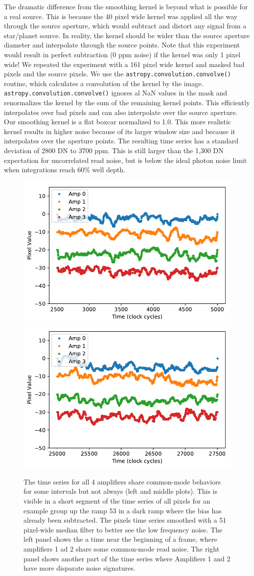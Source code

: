 \documentclass{aastex62}
\begin{document}
The dramatic difference from the smoothing kernel is beyond what is possible for a real source.
This is because the 40 pixel wide kernel was applied all the way through the source aperture, which would subtract and distort any signal from a star/planet source.
In reality, the kernel should be wider than the source aperture diameter and interpolate through the source points.
Note that this experiment would result in perfect subtraction (0 ppm noise) if the kernel was only 1 pixel wide!
We repeated the experiment with a 161 pixel wide kernel and masked bad pixels and the source pixels.
We use the \texttt{astropy.convolution.convolve()} routine, which calculates a convolution of the kernel by the image.
\texttt{astropy.convolution.convolve()} ignores al NaN values in the mask and renormalizes the kernel by the sum of the remaining kernel points.
This efficiently interpolates over bad pixels and can also interpolate over the source aperture.
Our smoothing kernel is a flat boxcar normalized to 1.0.
This more realistic kernel results in higher noise because of its larger window size and because it interpolates over the aperture points.
The resulting time series has a standard deviation of 2800 DN to 3700 ppm.
This is still larger than the 1,300 DN expectation for uncorrelated read noise, but is below the ideal photon noise limit when integrations reach 60\% well depth.


\begin{figure}[!hbtp]
\centering
\includegraphics[width=.32\columnwidth]{pixeltime_series_0.pdf}
\includegraphics[width=.32\columnwidth]{pixeltime_series_1.pdf}
\caption{The time series for all 4 amplifiers share common-mode behaviors for some intervals but not always (left and middle plots).
This is visible in a short segment of the time series of all pixels for an example group up the ramp 53 in a dark ramp where the bias has already been subtracted.
The pixels time series smoothed with a 51 pixel-wide median filter to better see the low frequency noise.
The left panel shows the a time near the beginning of a frame, where amplifiers 1 ad 2 share some common-mode read noise.
The right panel shows another part of the time series where Amplifiers 1 and 2 have more disparate noise signatures.
}\label{fig:darkPixelTimeSeries}
\end{figure}
\end{document}
